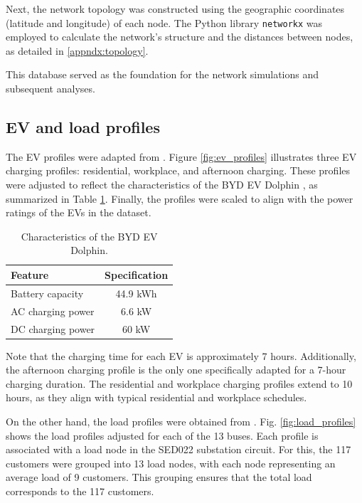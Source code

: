 \documentclass[12pt, 3p]{elsarticle}
\begin{document}
Next, the network topology was constructed using the geographic 
coordinates (latitude and longitude) of each node. The Python 
library \texttt{networkx} \cite{NetworkX} was employed to 
calculate the network's structure and the distances between 
nodes, as detailed in \ref{appndx:topology}.

This database served as the 
foundation for the network simulations and subsequent analyses.
    
\subsection{EV and load profiles}

The EV profiles were adapted from 
\cite{Richardson2013}. 
Figure \ref{fig:ev_profiles} illustrates three 
EV charging profiles: residential, 
workplace, and afternoon charging. These profiles were 
adjusted to reflect the characteristics of the BYD EV 
Dolphin \cite{byd}, as summarized in Table \ref{tab:byd_ev}. 
Finally, the profiles were scaled to align with the 
power ratings of the EVs in the dataset.

\begin{table}[!t]
    \centering
    \caption{Characteristics of the BYD EV Dolphin.}
    \label{tab:byd_ev}
    \begin{tabular}{lc}
        \hline
        \textbf{Feature} & \textbf{Specification} \\ \hline
        Battery capacity & 44.9 kWh \\ \hline
        AC charging power & 6.6 kW \\ \hline
        DC charging power & 60 kW \\ \hline
    \end{tabular}
\end{table}

Note that the charging time for each EV is approximately 7 
hours. Additionally, the afternoon charging profile is the 
only one specifically adapted for a 7-hour charging duration. 
The residential and workplace charging profiles extend to 10 
hours, as they align with typical residential and workplace 
schedules.

On the other hand, the load profiles were obtained 
from \cite{dataset_profiles}. Fig. \ref{fig:load_profiles} shows the 
load profiles adjusted for each of the 13 buses. Each profile is 
associated with a load node in the SED022 substation circuit. 
For this, the 117 customers were grouped into 13 load nodes, with 
each node representing an average load of 9 customers. This grouping 
ensures that the total load corresponds to the 117 customers.
\end{document}
